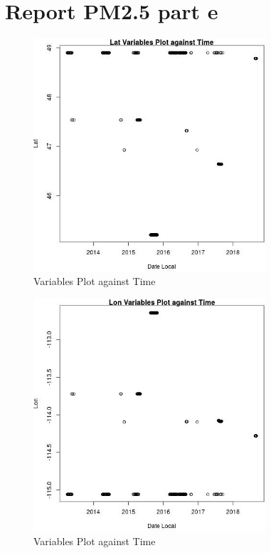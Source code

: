 
\section{Report PM2.5 part e} 
 

\begin{figure} 
\centering  
\includegraphics[width=0.77\textwidth]{Code_Outputs/Report_PM25_Step4_part_e_de_duplicated_aves_ML_input_LatvDate_Local.jpg} 
\caption{\label{fig:Report_PM25_Step4_part_e_de_duplicated_aves_ML_inputLatvDate_Local}Variables Plot against Time} 
\end{figure} 
 

\begin{figure} 
\centering  
\includegraphics[width=0.77\textwidth]{Code_Outputs/Report_PM25_Step4_part_e_de_duplicated_aves_ML_input_LonvDate_Local.jpg} 
\caption{\label{fig:Report_PM25_Step4_part_e_de_duplicated_aves_ML_inputLonvDate_Local}Variables Plot against Time} 
\end{figure} 
 

